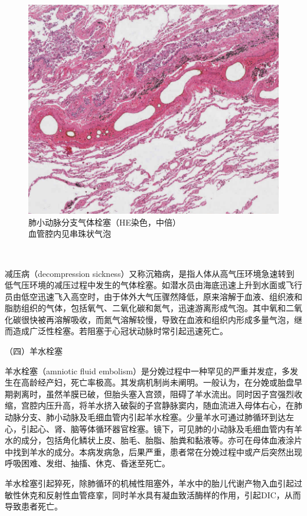 \begin{figure}[!htbp]
\centering
\includegraphics{./images/Image00045.jpg}
\caption{肺小动脉分支气体栓塞（HE染色，中倍） \\ {\small 血管腔内见串珠状气泡}}
\label{fig3-11} 
\end{figure} 　


减压病（decompression
sickness）又称沉箱病，是指人体从高气压环境急速转到低气压环境的减压过程中发生的气体栓塞。如潜水员由海底迅速上升到水面或飞行员由低空迅速飞入高空时，由于体外大气压骤然降低，原来溶解于血液、组织液和脂肪组织的气体，包括氧气、二氧化碳和氮气，迅速游离形成气泡。其中氧和二氧化碳很快被再溶解吸收，而氮气溶解较慢，导致在血液和组织内形成多量气泡，继而造成广泛性栓塞。若阻塞于心冠状动脉时常引起迅速死亡。

{（四）羊水栓塞}

羊水栓塞（amniotic fluid
embolism）是分娩过程中一种罕见的严重并发症，多发生在高龄经产妇，死亡率极高。其发病机制尚未阐明。一般认为，在分娩或胎盘早期剥离时，虽然羊膜已破，但胎头塞入宫颈，阻碍了羊水流出。同时因子宫强烈收缩，宫腔内压升高，将羊水挤入破裂的子宫静脉窦内，随血流进入母体右心，在肺动脉分支、肺小动脉及毛细血管内引起羊水栓塞。少量羊水可通过肺循环到达左心，引起心、肾、脑等体循环器官栓塞。镜下，可见肺的小动脉及毛细血管内有羊水的成分，包括角化鳞状上皮、胎毛、胎脂、胎粪和黏液等。亦可在母体血液涂片中找到羊水的成分。本病发病急，后果严重，患者常在分娩过程中或产后突然出现呼吸困难、发绀、抽搐、休克、昏迷至死亡。

羊水栓塞引起猝死，除肺循环的机械性阻塞外，羊水中的胎儿代谢产物入血引起过敏性休克和反射性血管痉挛，同时羊水具有凝血致活酶样的作用，引起DIC，从而导致患者死亡。

